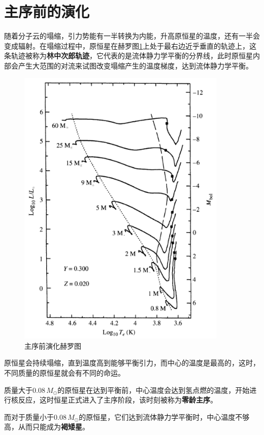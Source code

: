 \documentclass[openany]{ctexbook}
\begin{document}
\section{主序前的演化}
随着分子云的塌缩，引力势能有一半转换为内能，升高原恒星的温度，还有一半会变成辐射。在塌缩过程中，原恒星在赫罗图\ref{fig:hayashi}上处于最右边近乎垂直的轨迹上，这条轨迹被称为\textbf{林中次郎轨迹}，它代表的是流体静力学平衡的分界线，此时原恒星内部会产生大范围的对流来试图改变塌缩产生的温度梯度，达到流体静力学平衡。
\begin{figure}[hbt]
  \centering
  \includegraphics[width=10cm]{chapters/12/hayashi}
  \caption{主序前演化赫罗图}
  \label{fig:hayashi}
\end{figure}

原恒星会持续塌缩，直到温度高到能够平衡引力，而中心的温度是最高的，这时，不同质量的原恒星就会有不同的命运。

质量大于$0.08\,M_\odot$的原恒星在达到平衡前，中心温度会达到氢点燃的温度，开始进行核反应，这时恒星正式进入了主序阶段，该时刻被称为\textbf{零龄主序}。

而对于质量小于$0.08\,M_\odot$的原恒星，它们达到流体静力学平衡时，中心温度不够高，从而只能成为\textbf{褐矮星}。
\end{document}
